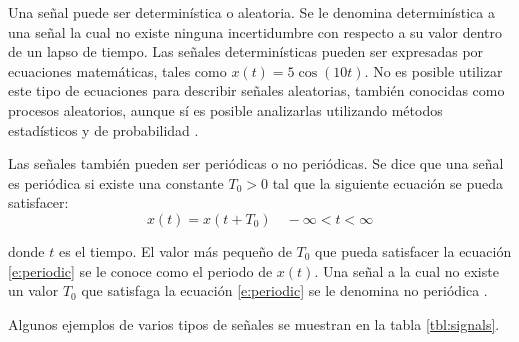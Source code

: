 Una se\~nal puede ser determin\'istica o aleatoria. Se le denomina
determin\'istica a una se\~nal la cual no existe ninguna incertidumbre con
respecto a su valor dentro de un lapso de tiempo. Las se\~nales
determin\'isticas pueden ser expresadas por ecuaciones matem\'aticas, tales como
$x(t)=5\cos(10t)$. No es posible utilizar este tipo de ecuaciones para describir
se\~nales aleatorias, tambi\'en conocidas como procesos aleatorios, aunque s\'i 
es posible analizarlas utilizando m\'etodos estad\'isticos y de probabilidad
\cite{sklar}.

Las se\~nales tambi\'en pueden ser peri\'odicas o no peri\'odicas. Se dice que
una se\~nal es peri\'odica si existe una constante $T_0 > 0$ tal que la
siguiente ecuaci\'on se pueda satisfacer:
\begin{equation}\label{e:periodic}
x(t)=x(t+T_0) \quad   -\infty<t<\infty
\end{equation}

donde $t$ es el tiempo. El valor m\'as peque\~no de $T_0$ que pueda satisfacer
la ecuaci\'on \eqref{e:periodic} se le conoce como el periodo de $x(t)$. Una
se\~nal a la cual no existe un valor $T_0$ que satisfaga la ecuaci\'on
\eqref{e:periodic} se le denomina no peri\'odica \cite{sklar}.

Algunos ejemplos de varios tipos de se\~nales se muestran en la tabla
\ref{tbl:signals}.

